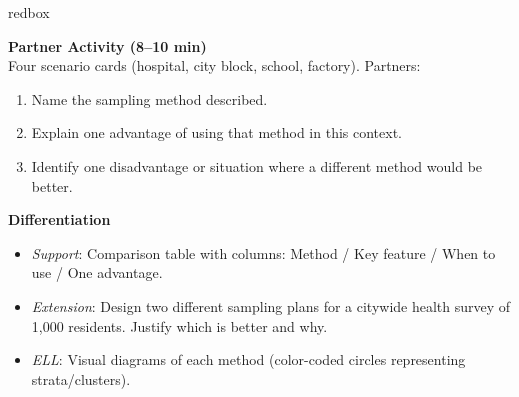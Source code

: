 \documentclass[10pt]{article}
\begin{document}
\begin{skillbox}{redbox}
\begin{minipage}[t]{0.48\linewidth}
    \textbf{Partner Activity (8--10 min)}\\
    Four scenario cards (hospital, city block, school, factory). Partners:
    \begin{enumerate}
        \item Name the sampling method described.
        \item Explain one advantage of using that method in this context.
        \item Identify one disadvantage or situation where a different method would
              be better.
    \end{enumerate}
\end{minipage}
\hfill
\begin{minipage}[t]{0.48\linewidth}
    \textbf{Differentiation}
    \begin{itemize}
        \item \textit{Support}: Comparison table with columns: Method / Key feature /
              When to use / One advantage.
        \item \textit{Extension}: Design two different sampling plans for a citywide
              health survey of 1{,}000 residents. Justify which is better and why.
        \item \textit{ELL}: Visual diagrams of each method (color-coded circles
              representing strata/clusters).
    \end{itemize}
\end{minipage}
\end{skillbox}
\end{document}
